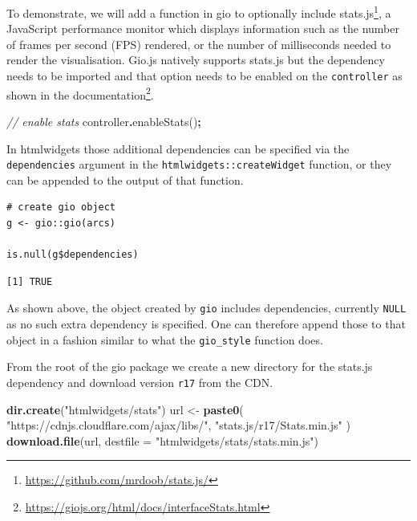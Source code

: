 \documentclass[
]{krantz}
\makeatletter
\newenvironment{Shaded}{\begin{snugshade}}{\end{snugshade}}
\newcommand{\CommentTok}[1]{\textcolor[rgb]{0.37,0.37,0.37}{\textit{#1}}}
\newcommand{\DataTypeTok}[1]{\textcolor[rgb]{0.27,0.27,0.27}{#1}}
\newcommand{\FunctionTok}[1]{\textcolor[rgb]{0,0,0}{#1}}
\newcommand{\KeywordTok}[1]{\textcolor[rgb]{0.27,0.27,0.27}{\textbf{#1}}}
\newcommand{\NormalTok}[1]{#1}
\newcommand{\OperatorTok}[1]{\textcolor[rgb]{0.43,0.43,0.43}{\textbf{#1}}}
\newcommand{\StringTok}[1]{\textcolor[rgb]{0.5,0.5,0.5}{#1}}
\renewcommand{\href}[2]{#2\footnote{\url{#1}}}
\newenvironment{kframe}{%
\medskip{}
\setlength{\fboxsep}{.8em}
 \def\at@end@of@kframe{}%
 \ifinner\ifhmode%
  \def\at@end@of@kframe{\end{minipage}}%
  \begin{minipage}{\columnwidth}%
 \fi\fi%
 \def\FrameCommand##1{\hskip\@totalleftmargin \hskip-\fboxsep
 \colorbox{shadecolor}{##1}\hskip-\fboxsep
     \hskip-\linewidth \hskip-\@totalleftmargin \hskip\columnwidth}%
 \MakeFramed {\advance\hsize-\width
   \@totalleftmargin\z@ \linewidth\hsize
   \@setminipage}}%
 {\par\unskip\endMakeFramed%
 \at@end@of@kframe}
\renewenvironment{Shaded}{\begin{kframe}}{\end{kframe}}
\makeatother
\begin{document}
To demonstrate, we will add a function in gio to optionally include \href{https://github.com/mrdoob/stats.js/}{stats.js}, a JavaScript performance monitor which displays information such as the number of frames per second (FPS) rendered, or the number of milliseconds needed to render the visualisation. Gio.js natively supports stats.js but the dependency needs to be imported and that option needs to be enabled on the \texttt{controller} as shown in the \href{https://giojs.org/html/docs/interfaceStats.html}{documentation}.

\begin{Shaded}
\begin{Highlighting}[]
\CommentTok{// enable stats}
\NormalTok{controller}\OperatorTok{.}\FunctionTok{enableStats}\NormalTok{()}\OperatorTok{;}
\end{Highlighting}
\end{Shaded}

In htmlwidgets those additional dependencies can be specified via the \texttt{dependencies} argument in the \texttt{htmlwidgets::createWidget} function, or they can be appended to the output of that function.

\begin{verbatim}
# create gio object
g <- gio::gio(arcs)

is.null(g$dependencies)
\end{verbatim}

\begin{verbatim}
[1] TRUE
\end{verbatim}

As shown above, the object created by \texttt{gio} includes dependencies, currently \texttt{NULL} as no such extra dependency is specified. One can therefore append those to that object in a fashion similar to what the \texttt{gio\_style} function does.

From the root of the gio package we create a new directory for the stats.js dependency and download version \texttt{r17} from the CDN.

\begin{Shaded}
\begin{Highlighting}[]
\KeywordTok{dir.create}\NormalTok{(}\StringTok{"htmlwidgets/stats"}\NormalTok{)}
\NormalTok{url \textless{}{-}}\StringTok{ }\KeywordTok{paste0}\NormalTok{(}
  \StringTok{"https://cdnjs.cloudflare.com/ajax/libs/"}\NormalTok{,}
  \StringTok{"stats.js/r17/Stats.min.js"}
\NormalTok{)}
\KeywordTok{download.file}\NormalTok{(url, }\DataTypeTok{destfile =} \StringTok{"htmlwidgets/stats/stats.min.js"}\NormalTok{)}
\end{Highlighting}
\end{Shaded}
\end{document}
